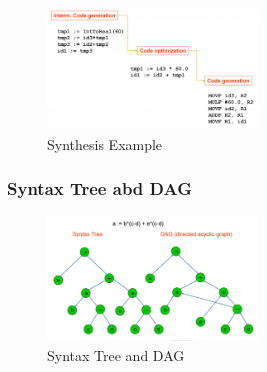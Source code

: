\begin{figure}[h]
	\begin{center}
		\includegraphics[width=0.5\textwidth]{images/Synthesis.png}
		\caption{Synthesis Example}
		\label{fig:synthesis}
	\end{center}
\end{figure}

\subsubsection{Syntax Tree abd DAG}
\begin{figure}[h]
	\begin{center}
		\includegraphics[width=0.5\textwidth]{images/Syn_and_DAG.png}
		\caption{Syntax Tree and DAG}
		\label{fig:syn_and_DAG}
	\end{center}
\end{figure}


